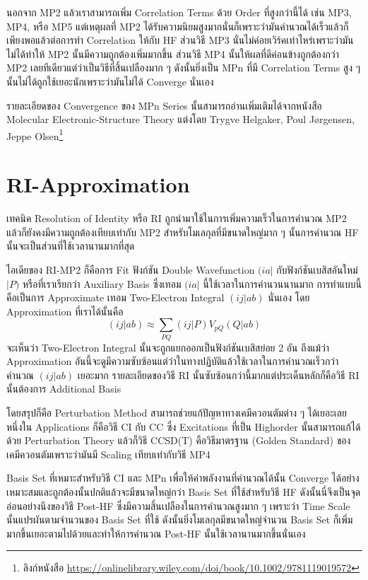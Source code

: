 นอกจาก MP2 แล้วเราสามารถเพิ่ม Correlation Terms ด้วย Order ที่สูงกว่านี้ได้ เช่น MP3, MP4, หรือ MP5 แต่เหตุผลที่ MP2 ได้รับความนิยมสูงมากนั่นก็เพราะว่ามันคำนวณได้เร็วแล้วก็เพียงพอแล้วต่อการทำ Correlation ให้กับ HF ส่วนวิธี MP3 นั่นไม่ค่อยเวิร์คเท่าไหร่เพราะว่ามันไม่ได้ทำให้ MP2 นั้นมีความถูกต้องเพิ่มมากขึ้น ส่วนวิธี MP4 นั้นให้ผลที่ดีค่อนข้างถูกต้องกว่า MP2 เลยทีเดียวแต่ว่าเป็นวิธีที่สิ้นเปลืองมาก ๆ ดังนั้นยิ่งเป็น MPn ที่มี Correlation Terms สูง ๆ นั้นไม่ได้ถูกใช้เยอะนักเพราะว่ามันไม่ได้ Converge นั่นเอง

รายละเอียดของ Convergence ของ MPn Series นั้นสามารถอ่านเพิ่มเติมได้จากหนังสือ Molecular Electronic-Structure Theory แต่งโดย Trygve Helgaker, Poul Jørgensen, Jeppe Olsen\footnote{ลิงก์หนังสือ \url{https://onlinelibrary.wiley.com/doi/book/10.1002/9781119019572}}

\section{RI-Approximation}

เทคนิค Resolution of Identity หรือ RI ถูกนำมาใช้ในการเพิ่มความเร็วในการคำนวณ MP2 แล้วก็ยังคงมีความถูกต้องเทียบเท่ากับ MP2 สำหรับโมเลกุลที่มีขนาดใหญ่มาก ๆ นั้นการคำนวณ HF นั้นจะเป็นส่วนที่ใช้เวลานานมากที่สุด

ไอเดียของ RI-MP2 ก็คือการ Fit ฟังก์ชัน Double Wavefunction $(ia|$ กับฟังก์ชันเบสิสอันใหม่ $|P)$ หรือที่เราเรียกว่า Auxiliary Basis ซึ่งเทอม $(ia|$ นี้ใช้เวลาในการคำนวนนานมาก การทำแบบนี้คือเป็นการ Approximate เทอม Two-Electron Integral $(ij|ab)$ นั่นเอง โดย Approximation ที่เราได้นั้นคือ
%
\begin{equation}
    (ij|ab) \approx \sum_{PQ} (ij|P) V_{pQ} (Q|ab)
\end{equation}
%
จะเห็นว่า Two-Electron Integral นั้นจะถูกแยกออกเป็นฟังก์ชันเบสิสย่อย 2 อัน ถึงแม้ว่า Approximation อันนี้จะดูมีความซับซ้อนแต่ว่าในทางปฏิบัติแล้วใช้เวลาในการคำนวณเร็วกว่าคำนวณ $(ij|ab)$ เยอะมาก รายละเอียดของวิธี RI นั้นซับซ้อนกว่านี้มากแต่ประเด็นหลักก็คือวิธี RI นั้นต้องการ Additional Basis

โดยสรุปก็คือ Perturbation Method สามารถช่วยแก้ปัญหาทางเคมีควอนตัมต่าง ๆ ได้เยอะเลย หนึ่งใน Applications ก็คือวิธี CI กับ CC ซึ่ง Excitations ที่เป็น Highorder นั้นสามารถแก้ได้ด้วย Perturbation Theory แล้วก็วิธี CCSD(T) คือวิธีมาตรฐาน (Golden Standard) ของเคมีควอนตัมเพราะว่ามันมี Scaling เทียบเท่ากับวิธี MP4

Basis Set ที่เหมาะสำหรับวิธี CI และ MPn เพื่อให้ค่าพลังงานที่คำนวณได้นั้น Converge ได้อย่างเหมาะสมและถูกต้องนั้นปกติแล้วจะมีขนาดใหญ่กว่า Basis Set ที่ใช้สำหรับวิธี HF ดังนั้นนี่จึงเป็นจุดอ่อนอย่างนึงของวิธี Post-HF ซึ่งมีความสิ้นเปลืองในการคำนวณสูงมาก ๆ เพราะว่า Time Scale นั้นแปรผันตามจำนวนของ Basis Set ที่ใช้ ดังนั้นยิ่งโมเลกุลมีขนาดใหญ่จำนวน Basis Set ก็เพิ่มมากขึ้นเยอะตามไปด้วยและทำให้การคำนวณ Post-HF นั้นใช้เวลานานมากขึ้นนั่นเอง
